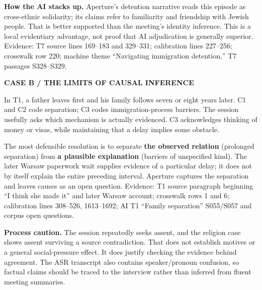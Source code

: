 \documentclass[10pt,a4paper]{article}
\newcommand{\kicker}[1]{{\sffamily\small\bfseries\color{teal}#1}\par\vspace{5pt}}
\newcommand{\source}[1]{{\footnotesize\color{muted}Evidence: #1}\par}
\begin{document}
\textbf{How the AI stacks up.} Aperture's detention narrative reads this episode as cross-ethnic solidarity; its claims refer to familiarity and friendship with Jewish people. That is better supported than the meeting's identity inference. This is a local evidentiary advantage, not proof that AI adjudication is generally superior.
\source{T7 source lines 169--183 and 329--331; calibration lines 227--256; crosswalk row 220; machine theme ``Navigating immigration detention,'' T7 passages S328--S329.}

\vspace{4mm}
\kicker{CASE B / THE LIMITS OF CAUSAL INFERENCE}
In T1, a father leaves first and his family follows seven or eight years later. C1 and C2 code separation; C3 codes immigration-process barriers. The session usefully asks which mechanism is actually evidenced. C3 acknowledges thinking of money or visas, while maintaining that a delay implies some obstacle.

The most defensible resolution is to separate \textbf{the observed relation} (prolonged separation) from \textbf{a plausible explanation} (barriers of unspecified kind). The later Warsaw paperwork wait supplies evidence of a particular delay; it does not by itself explain the entire preceding interval. Aperture captures the separation and leaves causes as an open question.
\source{T1 source paragraph beginning ``I think she made it'' and later Warsaw account; crosswalk rows 1 and 6; calibration lines 308--526, 1613--1692; AI T1 ``Family separation'' S055/S057 and corpus open questions.}

\begin{caution}
\textbf{Process caution.} The session repeatedly seeks assent, and the religion case shows assent surviving a source contradiction. That does not establish motives or a general social-pressure effect. It does justify checking the evidence behind agreement. The ASR transcript also contains speaker/pronoun confusion, so factual claims should be traced to the interview rather than inferred from fluent meeting summaries.
\end{caution}
\end{document}
